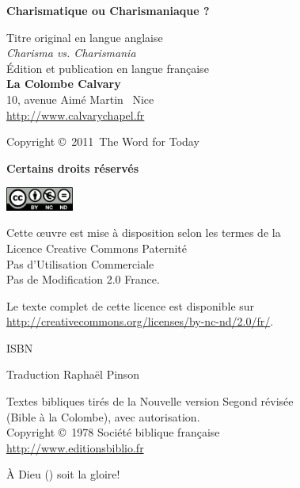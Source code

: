 \newpage
\mbox{}
\vfill

{\scriptsize

{\bfseries Charismatique ou Charismaniaque ?}

Titre original en langue anglaise\frcolon{}\\
\emph{Charisma vs. Charismania} \\

Édition et publication en langue française\frcolon{}\\
 {\bfseries La Colombe Calvary}\\
 10, avenue Aimé Martin ~Nice\\
 \url{http://www.calvarychapel.fr}

Copyright \copyright{}~2011~The Word for Today

{\bfseries Certains droits réservés}

\ifluatex
  \includegraphics[width=6em]{images/by-nc-nd_eu}
\fi

Cette \oe{}uvre est mise à disposition selon les termes de la \\
 Licence Creative Commons Paternité \\
 \ocadr Pas d'Utilisation Commerciale \\
 \ocadr Pas de Modification 2.0 France.

Le texte complet de cette licence est disponible sur \\
 \url{http://creativecommons.org/licenses/by-nc-nd/2.0/fr/}.

ISBN~\isbn

Traduction\frcolon{} Raphaël Pinson

Textes bibliques tirés de la Nouvelle version Segond révisée \\
 (Bible à la Colombe), avec autorisation. \\
 Copyright \copyright{}~1978 Société biblique française \\
 \url{http://www.editionsbiblio.fr}

À Dieu (\YHWH) soit la gloire!

}
\enlargethispage{\footskip}
\pagebreak


